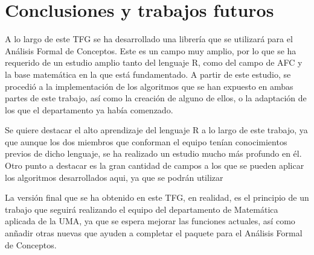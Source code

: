 \section{Conclusiones y trabajos futuros}
A lo largo de este TFG se ha desarrollado una librer\'ia que se utilizar\'a para el An\'alisis Formal de Conceptos. Este es un 
campo muy amplio, por lo que se ha requerido de un estudio amplio tanto del lenguaje R, como del campo de AFC y la base matem\'atica en la que 
est\'a fundamentado. A partir de este estudio, se procedi\'o a la implementaci\'on de los algoritmos que se han expuesto en ambas partes de 
este trabajo, as\'i como la creaci\'on de alguno de ellos, o la adaptaci\'on de los que el departamento ya hab\'ia comenzado.

Se quiere destacar el alto aprendizaje del lenguaje R a lo largo de este trabajo, ya que aunque los dos miembros que conforman el equipo ten\'ian 
conocimientos previos de dicho lenguaje, se ha realizado un estudio mucho m\'as profundo en \'el.
Otro punto a destacar es la gran cantidad de campos a los que se pueden aplicar los algoritmos desarrollados aqui, ya que se podr\'an 
utilizar 

La versi\'on final que se ha obtenido en este TFG, en realidad, es el principio de un trabajo que seguir\'a realizando el equipo del 
departamento de Matem\'atica aplicada de la UMA, ya que se espera mejorar las funciones actuales, as\'i como an\~nadir otras nuevas 
que ayuden a completar el paquete para el An\'alisis Formal de Conceptos.

\newpage